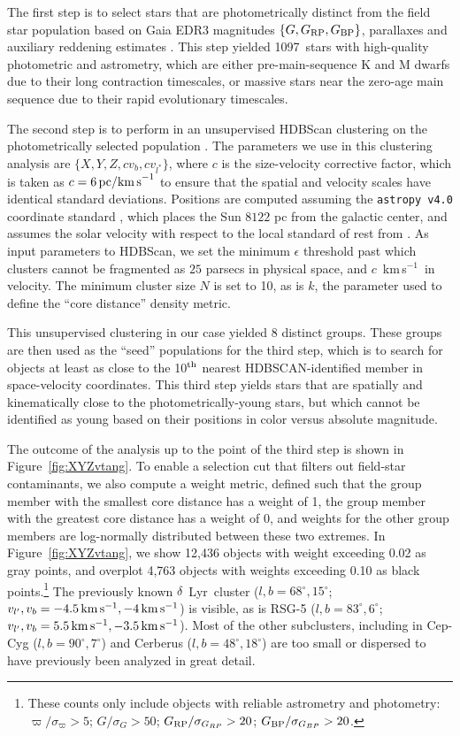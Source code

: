 \documentclass[12pt,twocolumn,linenumbers]{aastex63}
\newcommand{\npms}{1097} %
\newcommand{\kms}{\,km\,s$^{-1}$}
\newcommand{\mkms}{{\rm \,km\,s^{-1}}}  %
\begin{document}
The first step is to select stars that are photometrically distinct
from the field star population based on Gaia EDR3 magnitudes $\{G,
G_{\rm RP}, G_{\rm BP}\}$, parallaxes and auxiliary reddening
estimates \citep{lallement_gaia-2mass_2019}.  This step yielded \npms\
stars with high-quality photometric and astrometry, which are either
pre-main-sequence K and M dwarfs due to their long contraction
timescales, or massive stars near the zero-age main sequence due to
their rapid evolutionary timescales.

The second step is to perform in an unsupervised HDBScan
clustering on the photometrically selected population
\citep{campello_hierarchical_2015,mcinnes_hdbscan_2017}.  The
parameters we use in this clustering analysis are $\{ X, Y, Z, c v_b,
c v_{l^*} \} $, where $c$ is the size-velocity corrective factor,
which is taken as $c=6\,{\rm pc / km\,s}^{-1}$ to ensure that the
spatial and velocity scales have identical standard deviations.
Positions are computed assuming the \texttt{astropy v4.0} coordinate
standard \citep{astropy_2018}, which places the Sun $8122$ pc from the
galactic center, and assumes the solar velocity with respect to the
local standard of rest from \citet{schonrich_local_2010}.  As input
parameters to HDBScan, we set the minimum $\epsilon$ threshold past
which clusters cannot be fragmented as $25$ parsecs in physical space,
and $c$ \kms\ in velocity.  The minimum cluster size $N$ is set to 10,
as is $k$, the parameter used to define the ``core distance'' density
metric. 

This unsupervised clustering in our case yielded 8 distinct groups.
These groups are then used as the ``seed'' populations for the third
step, which is to search for objects at least as close to the 10$^{\rm
th}$ nearest HDBSCAN-identified member in space-velocity coordinates.
This third step yields stars that are spatially and kinematically
close to the photometrically-young stars, but which cannot be
identified as young based on their positions in color versus absolute
magnitude.

The outcome of the analysis up to the point of the third step is shown
in Figure~\ref{fig:XYZvtang}.  To enable a selection cut that filters
out field-star contaminants, we also compute a weight metric, defined
such that the group member with the smallest core distance has a
weight of 1, the group member with the greatest core distance has a
weight of 0, and weights for the other group members are log-normally
distributed between these two extremes.  In Figure~\ref{fig:XYZvtang},
we show 12{,}436 objects with weight exceeding 0.02 as gray points,
and overplot 4{,}763 objects with weights exceeding 0.10 as black
points.\footnote{These counts only include objects with reliable astrometry
	and photometry: $\varpi/\sigma_\varpi>5$;
	$G/\sigma_{G}>50$;
	$G_{\rm RP}/\sigma_{G_{RP}}>20$;
	$G_{\rm BP}/\sigma_{G_{BP}}>20$.}
The previously known $\delta$~Lyr\ cluster ($l,b=68^\circ,15^\circ$;
$v_{l'}, v_b=-4.5 \mkms,-4 \mkms$) is visible, as is RSG-5
($l,b=83^\circ,6^\circ$; $v_{l'}, v_b=5.5 \mkms,-3.5 \mkms$).
Most of the other subclusters, including in Cep-Cyg
($l,b=90^\circ,7^\circ$) and Cerberus ($l,b=48^\circ,18^\circ$) are
too small or dispersed to have previously been analyzed in great
detail.
\end{document}
